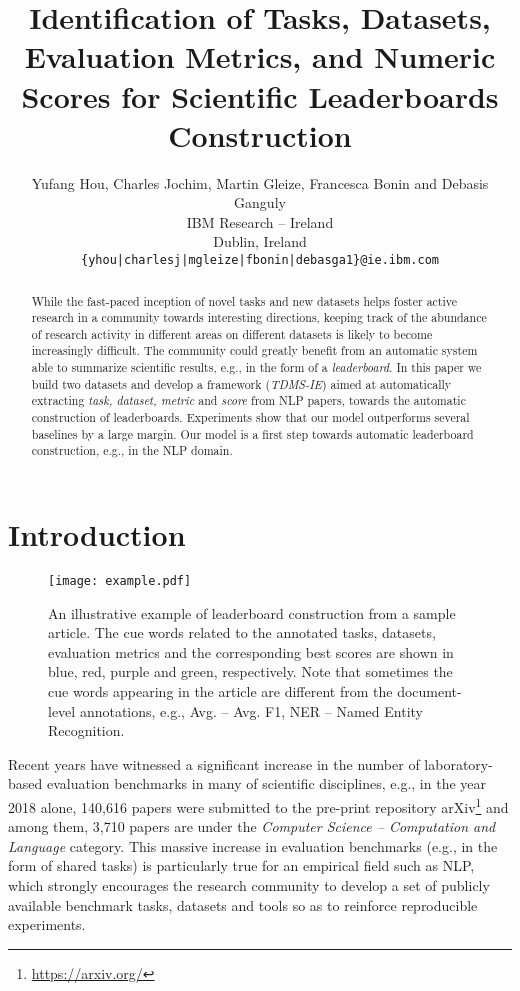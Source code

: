 \documentclass[11pt,a4paper]{article}
\title{Identification of Tasks, Datasets, Evaluation Metrics, and Numeric Scores for Scientific Leaderboards Construction}
\author{Yufang Hou, Charles Jochim, Martin Gleize, Francesca Bonin and Debasis Ganguly \\
IBM Research -- Ireland \\
Dublin, Ireland \\
  \texttt{\{yhou|charlesj|mgleize|fbonin|debasga1\}@ie.ibm.com} \\}
\date{}
\begin{document}
\maketitle


\begin{abstract}

While the fast-paced inception of novel tasks and new datasets helps foster active research in a community towards interesting directions, keeping track of the abundance of research activity in different areas on different datasets is likely to become increasingly difficult. The community could greatly benefit from an automatic system able to summarize scientific results, e.g., in the form of a \textit{leaderboard}.
In this paper we  build two datasets and develop a framework (\emph{TDMS-IE}) aimed at automatically extracting \textit{task, dataset, metric} and \textit{score} from NLP papers, towards the automatic construction of leaderboards. Experiments show that our model outperforms several baselines by a large margin. 
Our model is a first step towards automatic leaderboard construction, e.g., in the NLP domain.
\end{abstract}

\section{Introduction}\label{sec:intro}
\begin{figure*}[t]
\begin{center}
\texttt{[image: example.pdf]}
\end{center}
\caption{An illustrative example of leaderboard construction from a sample article. The cue words related to the annotated tasks, datasets, evaluation metrics and the corresponding best scores are shown in blue, red, purple and green, respectively. 
Note that sometimes the cue words appearing in the article are different from the document-level annotations, e.g., Avg. -- Avg. F1, NER -- Named Entity Recognition.}
\label{fig:example}
\end{figure*}

Recent years have witnessed a significant increase in the number of laboratory-based evaluation benchmarks in many of scientific disciplines, e.g.,
in the year 2018 alone, 140,616 papers were submitted to the pre-print repository arXiv\footnote{\url{https://arxiv.org/}} and among them, 3,710 papers are under the \emph{Computer Science -- Computation and Language} category.
This massive increase in evaluation benchmarks (e.g., in the form of shared tasks) is particularly true for an empirical field such as NLP, which strongly encourages the research community to develop a set of publicly available benchmark tasks, datasets and tools so as to reinforce reproducible experiments.
\end{document}
